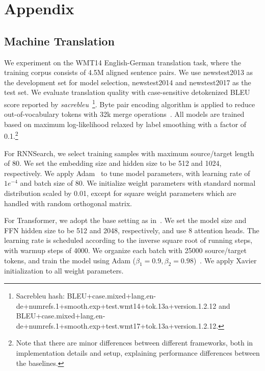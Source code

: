 \documentclass{article}
\begin{document}



\newpage
\appendix

\section{Appendix}

\subsection{Machine Translation}\label{app_mt}

We experiment on the WMT14 English-German translation task, where the training corpus consists of 4.5M aligned sentence pairs. We use newstest2013 as the development set for model selection, newstest2014 and newstest2017 as the test set. We evaluate translation quality with case-sensitive detokenized BLEU score reported by \textit{sacrebleu}~\cite{post2018call}\footnote{Sacrebleu hash: {BLEU+case.mixed+lang.en-de+numrefs.1+smooth.exp+test.wmt14+tok.13a+version.1.2.12 and BLEU+case.mixed+lang.en-de+numrefs.1+smooth.exp+test.wmt17+tok.13a+version.1.2.12.}}. Byte pair encoding algorithm is applied to reduce out-of-vocabulary tokens with 32k merge operations~\cite{sennrich2015neural}. All models are trained based on maximum log-likelihood relaxed by label smoothing with a factor of 0.1.\footnote{Note that there are minor differences between different frameworks, both in implementation details and setup, explaining performance differences between the baselines.}

For RNNSearch, we select training samples with maximum source/target length of 80. We set the embedding size and hidden size to be 512 and 1024, respectively. We apply Adam~\cite{kingma2014adam} to tune model parameters, with learning rate of $1e^{-4}$ and batch size of 80. We initialize weight parameters with standard normal distribution scaled by 0.01, except for square weight parameters which are handled with random orthogonal matrix.

For Transformer, we adopt the base setting as in~\cite{NIPS2017_7181}. We set the model size and FFN hidden size to be 512 and 2048, respectively, and use 8 attention heads. The learning rate is scheduled according to the inverse square root of running steps, with warmup steps of 4000. We organize each batch with 25000 source/target tokens, and train the model using Adam ($\beta_1=0.9, \beta_2=0.98$)~\cite{kingma2014adam}. We apply Xavier initialization to all weight parameters.
\end{document}
